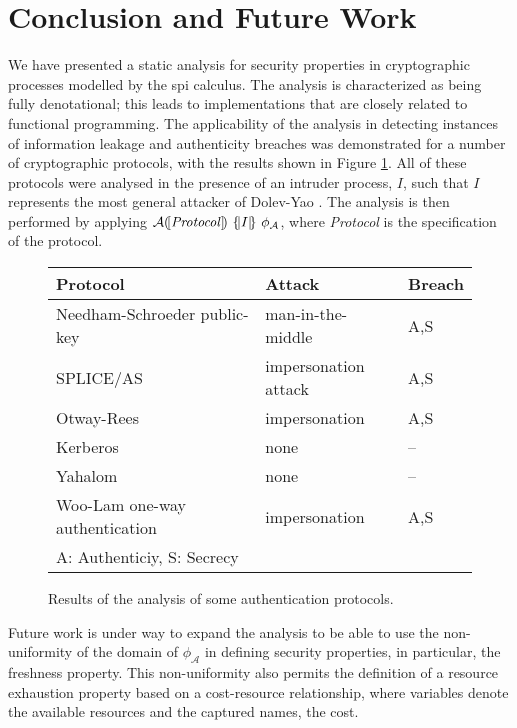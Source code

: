 \documentclass{entcs} \usepackage{entcsmacro}
\begin{document}
\section{Conclusion and Future Work}
We have presented a static analysis for security properties in cryptographic processes modelled by the spi calculus.  The analysis is characterized as being fully denotational; this leads to implementations that are closely related to functional programming.  The applicability of the analysis in detecting instances of information leakage and authenticity breaches was demonstrated for a number of cryptographic protocols, with the results shown in Figure \ref{protocols}.  All of these protocols were analysed in the presence of an intruder process, $I$, such that $I$ represents the most general attacker of Dolev-Yao \cite{dolev1}.  The analysis is then performed by applying $\mathcal{A}(\![\mbox{{\itshape Protocol\/}}]\!)~\{\!|I|\!\}~\phi_\mathcal{A}$, where {\itshape Protocol\/} is the specification of the protocol.
\begin{figure}[bht]
\begin{center}
\begin{tabular}{|l|l|l|}\hline
\bf{Protocol}&\bf{Attack}&\bf{Breach}\\\hline
Needham-Schroeder public-key&man-in-the-middle~~~~&A,S\\
SPLICE/AS&impersonation attack&A,S\\
Otway-Rees&impersonation&A,S\\
Kerberos&none&--\\
Yahalom&none&--\\
Woo-Lam one-way authentication~~~~&impersonation&A,S\\
\hline
\multicolumn{3}{|l|}{{\footnotesize A: Authenticiy, S: Secrecy}}\\
\hline 
\end{tabular}
\end{center}
\caption{Results of the analysis of some authentication protocols.\label{protocols}}
\end{figure}

Future work is under way to expand the analysis to be able to use the non-uniformity of the domain of $\phi_\mathcal{A}$ in defining security properties, in particular, the freshness property.  This non-uniformity also permits the definition of a resource exhaustion property based on a cost-resource relationship, where variables denote the available resources and the captured names, the cost.

\end{document}
